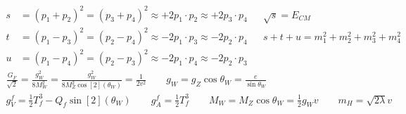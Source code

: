 \begin{align*}
        s
        &= (p_1 + p_2)^2 = (p_3 + p_4)^2
        \approx +2p_1\cdot p_2 \approx +2p_3\cdot p_4
        &&
        \sqrt{s} = E_{CM}
        \\
        t
        &= (p_1 - p_3)^2 = (p_2 - p_4)^2
        \approx -2p_1\cdot p_3 \approx -2p_2\cdot p_4
        &&
        s + t + u = m_1^2 + m_2^2 + m_3^2 + m_4^2
        \\
        u
        &= (p_1 - p_4)^2 = (p_2 - p_3)^2
        \approx -2p_1\cdot p_4 \approx -2p_2\cdot p_3
\end{align*}
\begin{gather*}
        \frac{G_F}{\sqrt{2}} = \frac{g_W^2}{8M_W^2} = \frac{g_W^2}{8M_Z^2\cos[2](\theta_W)} = \frac{1}{2v^2}
        \qquad
        g_W = g_Z\cos\theta_W = \frac{e}{\sin\theta_W}
        \\
        g_V^f = \frac{1}{2}T_f^3 - Q_f\sin[2](\theta_W)
        \qquad
        g_A^f = \frac{1}{2}T_f^3
        \qquad
        M_W = M_Z\cos\theta_W = \frac{1}{2}g_Wv
        \qquad
        m_H = \sqrt{2\lambda}v
\end{gather*}

